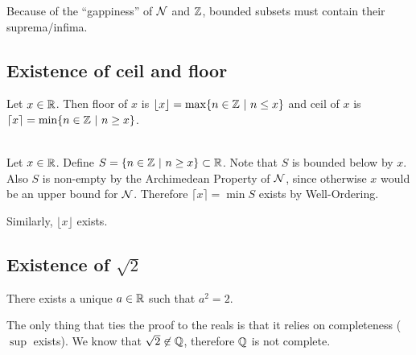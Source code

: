 \begin{intuition*}
  Because of the ``gappiness'' of $\mathcal{N}$ and $\mathbb{Z}$, bounded subsets must contain their suprema/infima.
\end{intuition*}

\subsection{Existence of ceil and floor}
\begin{definition*}
  Let $x \in \mathbb{R}$. Then floor of $x$ is $\lfloor x \rfloor = \max\{n \in \mathbb{Z} ~|~ n \leq x\}$ and ceil
  of $x$ is $\lceil x \rceil = \min\{n \in \mathbb{Z} ~|~ n \geq x\}$.
\end{definition*}

\begin{theorem*}~\\
  Let $x \in \mathbb{R}$. Define $S = \{n \in \mathbb{Z} ~|~ n \geq x\} \subset \mathbb{R}$. Note that $S$ is bounded below
  by $x$. Also $S$ is non-empty by the Archimedean Property of $\mathcal{N}$, since otherwise $x$ would be
  an upper bound for $\mathcal{N}$. Therefore $\lceil x \rceil = \min S$ exists by Well-Ordering.

  Similarly, $\lfloor x \rfloor$ exists.
\end{theorem*}

\subsection{Existence of $\sqrt 2$}
\begin{theorem*}
  There exists a unique $a \in \mathbb{R}$ such that $a^2 = 2$.
\end{theorem*}

\begin{remark*}
  The only thing that ties the proof to the reals is that it relies on completeness ($\sup$
  exists). We know that $\sqrt 2 \not\in \mathbb{Q}$, therefore $\mathbb{Q}$ is not complete.
\end{remark*}

